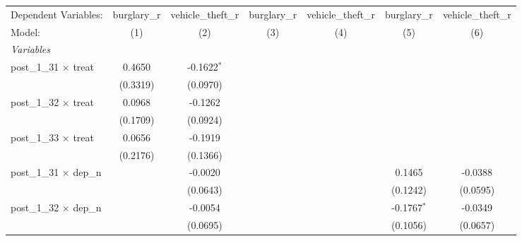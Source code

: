 \begingroup
\centering
\begin{tabular}{lcccccc}
   \tabularnewline \midrule \midrule
   Dependent Variables:                                     & burglary\_r  & vehicle\_theft\_r   & burglary\_r  & vehicle\_theft\_r   & burglary\_r   & vehicle\_theft\_r\\    
   Model:                                                   & (1)          & (2)                 & (3)          & (4)                 & (5)           & (6)\\  
   \midrule
   \emph{Variables}\\
   post\_1\_31 $\times$ treat                               & 0.4650       & -0.1622$^{*}$       &              &                     &               &   \\   
                                                            & (0.3319)     & (0.0970)            &              &                     &               &   \\   
   post\_1\_32 $\times$ treat                               & 0.0968       & -0.1262             &              &                     &               &   \\   
                                                            & (0.1709)     & (0.0924)            &              &                     &               &   \\   
   post\_1\_33 $\times$ treat                               & 0.0656       & -0.1919             &              &                     &               &   \\   
                                                            & (0.2176)     & (0.1366)            &              &                     &               &   \\   
   post\_1\_31 $\times$ dep\_n                              &              & -0.0020             &              &                     & 0.1465        & -0.0388\\   
                                                            &              & (0.0643)            &              &                     & (0.1242)      & (0.0595)\\   
   post\_1\_32 $\times$ dep\_n                              &              & -0.0054             &              &                     & -0.1767$^{*}$ & -0.0349\\   
                                                            &              & (0.0695)            &              &                     & (0.1056)      & (0.0657)\\   

\end{tabular}
